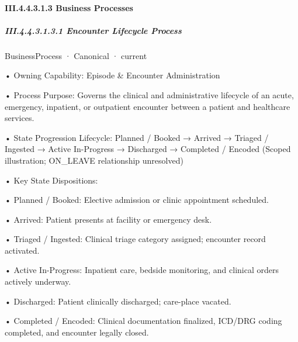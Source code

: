 \paragraph*{III.4.4.3.1.3 Business Processes}
\label{navigation:III.4.4.3.1.3}

\subparagraph*{III.4.4.3.1.3.1 Encounter Lifecycle Process}
\label{navigation:III.4.4.3.1.3.1}

\label{element:df49e2e8bb3748f3abbdd1c28ae1be8f}
{\small BusinessProcess · Canonical · current}\par

•
Owning Capability: Episode \& Encounter Administration



•
Process Purpose: Governs the clinical and administrative lifecycle of an acute, emergency, inpatient, or outpatient encounter between a patient and healthcare services.



•
State Progression Lifecycle: Planned / Booked → Arrived → Triaged / Ingested → Active In-Progress → Discharged → Completed / Encoded   (Scoped illustration; ON\_LEAVE relationship unresolved)



•
Key State Dispositions:



•
Planned / Booked: Elective admission or clinic appointment scheduled.



•
Arrived: Patient presents at facility or emergency desk.



•
Triaged / Ingested: Clinical triage category assigned; encounter record activated.



•
Active In-Progress: Inpatient care, bedside monitoring, and clinical orders actively underway.



•
Discharged: Patient clinically discharged; care-place vacated.



•
Completed / Encoded: Clinical documentation finalized, ICD/DRG coding completed, and encounter legally closed.



